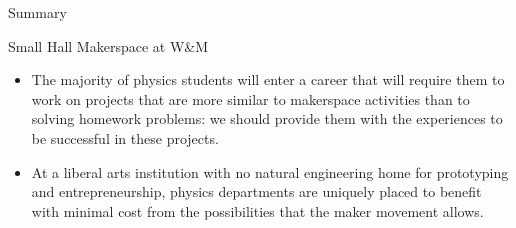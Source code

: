 \documentclass[xcolor=table,compress,professionalfonts,pdfpagelabels]{beamer}
\begin{document}
\begin{frame}{Summary}
 \begin{block}{Small Hall Makerspace at W\&M}
  \begin{itemize}
   \item The majority of physics students will enter a career that will require them to work on projects that are more similar to makerspace activities than to solving homework problems: we should provide them with the experiences to be successful in these projects.
   \item At a liberal arts institution with no natural engineering home for prototyping and entrepreneurship, physics departments are uniquely placed to benefit with minimal cost from the possibilities that the maker movement allows.
  \end{itemize}
 \end{block}
\end{frame}
\end{document}

